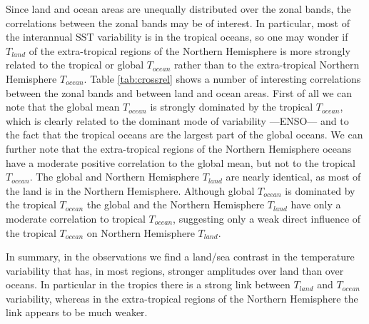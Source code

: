 Since land and ocean areas are unequally distributed over the zonal bands, the 
correlations between the zonal bands may be of interest. In particular, most of 
the interannual SST variability is in the tropical oceans, so one may wonder if 
$T_{land}$ of the extra-tropical regions of the Northern Hemisphere is more 
strongly related to the tropical or global $T_{ocean}$ rather than to the 
extra-tropical Northern Hemisphere $T_{ocean}$. Table \ref{tab:crossrel} shows a 
number of interesting correlations between the zonal bands and between land and 
ocean areas.  First of all we can note that the global mean $T_{ocean}$ is 
strongly dominated by the tropical $T_{ocean}$, which is clearly related to the 
dominant mode of variability ---ENSO--- and to the fact that the tropical oceans 
are the largest part of the global oceans. We can further note that the 
extra-tropical regions of the Northern Hemisphere oceans have a moderate 
positive correlation to the global mean, but not to the tropical $T_{ocean}$.  
The global and Northern Hemisphere $T_{land}$ are nearly identical, as most of 
the land is in the Northern Hemisphere. Although global $T_{ocean}$ is dominated 
by the tropical $T_{ocean}$ the global and the  Northern Hemisphere $T_{land}$ 
have only a moderate correlation to tropical $T_{ocean}$, suggesting only a weak 
direct influence of the tropical $T_{ocean}$ on Northern Hemisphere $T_{land}$.

In summary, in the observations we find a land/sea contrast in the temperature 
variability that has, in most regions, stronger amplitudes over land than over 
oceans. In particular in the tropics there is a strong link between $T_{land}$ 
and $T_{ocean}$ variability, whereas in the extra-tropical regions of the 
Northern Hemisphere the link appears to be much weaker.

